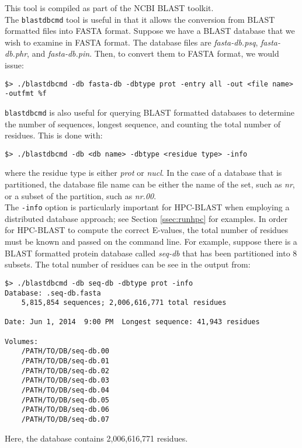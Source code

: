 \documentclass[10pt]{article}
\begin{document}
 This tool is compiled as part of the NCBI BLAST toolkit.\\

The \verb^blastdbcmd^ tool is useful in that it allows the conversion from BLAST formatted files into FASTA format.  Suppose we have a BLAST database that we wish to examine in FASTA format.  The database files are
\emph{fasta-db.psq}, \emph{fasta-db.phr}, and \emph{fasta-db.pin}.  Then, to convert them to FASTA format, we would issue:
\begin{verbatim}
$> ./blastdbcmd -db fasta-db -dbtype prot -entry all -out <file name> -outfmt %f
\end{verbatim}

\noindent \verb^blastdbcmd^ is also useful for querying BLAST formatted databases to determine the number of sequences, longest sequence, and counting the total number of residues.  This is done with:
\begin{verbatim}
$> ./blastdbcmd -db <db name> -dbtype <residue type> -info
\end{verbatim}
\noindent where the residue type is either \emph{prot} or \emph{nucl}.  In the case of a database that is partitioned, the database file name can be either the name of the set, such as \emph{nr}, or a subset of the partition,
such as \emph{nr.00}.\\

The \verb^-info^ option is particularly important for HPC-BLAST when employing a distributed database approach; see Section \ref{ssec:runhpc} for examples. In order for HPC-BLAST to compute the correct E-values, the total number of
residues must be known and passed on the command line.  For example, suppose there is a BLAST formatted protein database called \emph{seq-db} that has been partitioned into 8 subsets. The total number of residues can be see in the output from:
\begin{verbatim}
$> ./blastdbcmd -db seq-db -dbtype prot -info
Database: .seq-db.fasta
	5,815,854 sequences; 2,006,616,771 total residues

Date: Jun 1, 2014  9:00 PM	Longest sequence: 41,943 residues

Volumes:
	/PATH/TO/DB/seq-db.00
	/PATH/TO/DB/seq-db.01
	/PATH/TO/DB/seq-db.02
	/PATH/TO/DB/seq-db.03
	/PATH/TO/DB/seq-db.04
	/PATH/TO/DB/seq-db.05
	/PATH/TO/DB/seq-db.06
	/PATH/TO/DB/seq-db.07
\end{verbatim}
\noindent Here, the database contains 2,006,616,771 residues.\\
\end{document}

